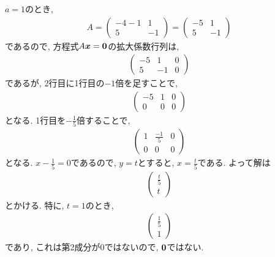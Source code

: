 \begin{checkanswer}%
  $a=1$のとき,
  \begin{align*}
    A=\begin{pmatrix}-4-1&1\\5&-1\end{pmatrix}
    =\begin{pmatrix}-5&1\\5&-1\end{pmatrix}
  \end{align*}
  であるので, 方程式$A\boldsymbol{x}=\boldsymbol{0}$の拡大係数行列は,
  \begin{align*}
    \begin{pmatrix}-5&1&0\\5&-1&0\end{pmatrix}
  \end{align*}
  であるが, 2行目に1行目の$-1$倍を足すことで,
  \begin{align*}
    \begin{pmatrix}-5&1&0\\0&0&0\end{pmatrix}
  \end{align*}
  となる. 1行目を$-\frac{1}{5}$倍することで,
  \begin{align*}
    \begin{pmatrix}1&\frac{-1}{5}&0\\0&0&0\end{pmatrix}
  \end{align*}
  となる.  $x-\frac{1}{5}=0$であるので, $y=t$とすると, $x=\frac{t}{5}$である.
  よって解は
  \begin{align*}
    \begin{pmatrix}\frac{t}{5}\\t\end{pmatrix}
  \end{align*}
  とかける. 特に, $t=1$のとき,
  \begin{align*}
    \begin{pmatrix}\frac{1}{5}\\1\end{pmatrix}
  \end{align*}
  であり, これは第2成分が$0$ではないので, $\boldsymbol{0}$ではない.


\end{checkanswer}
